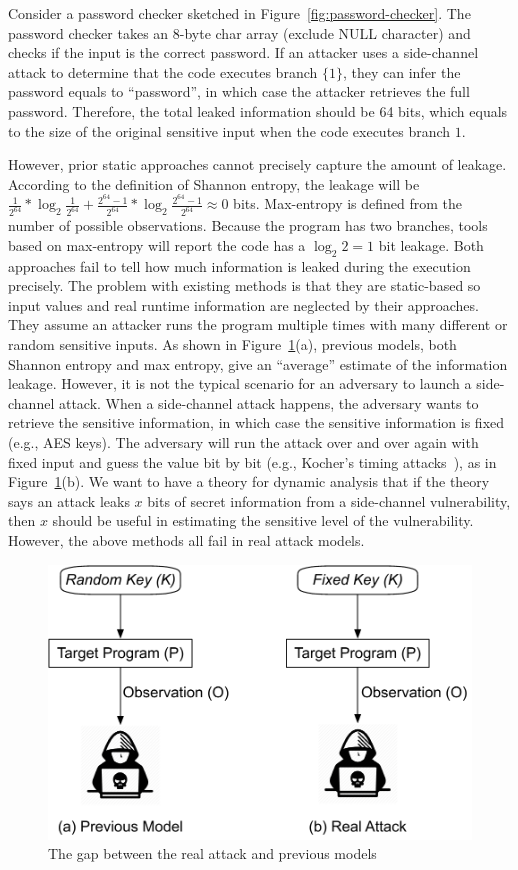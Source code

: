 Consider a password checker sketched in Figure~\ref{fig:password-checker}.
The password checker takes an 8-byte char array (exclude \textsf{NULL} character)
and checks if the input is the correct password. If an attacker uses a side-channel attack to determine that the code executes branch
$\{{1\}}$, they can infer the password equals to
``password'', in which case the attacker retrieves the full password.
Therefore, the total leaked information should be 64 bits, which equals to the
size of the original sensitive input when the code executes branch
$1$.

However, prior static approaches cannot precisely capture the amount of leakage. According to the definition of Shannon entropy, the leakage will be
$\frac{1}{2^{64}}*\log_{2}\frac{1}{2^{64}} + \frac{2^{64}-1}{2^{64}}
    *\log_{2}\frac{2^{64}-1}{2^{64}} \approx 0$ bits. Max-entropy is defined from the
number of possible observations. Because the program has two
branches, tools based on max-entropy will report the code has a $\log_2{2} = 1$
bit leakage.
Both approaches fail to tell how much information is leaked during the execution
precisely. The problem with existing methods is that they are static-based so
input values and real runtime information are neglected by their approaches.
They assume an attacker runs
the program multiple times with many different or random sensitive inputs. As
shown in Figure~\ref{fig:gap}(a), previous models, both Shannon entropy and max
entropy, give an ``average'' estimate of the information leakage. However, it is
not the typical scenario for an adversary to launch a side-channel attack. When
a side-channel attack happens, the adversary wants to retrieve the sensitive
information, in which case the sensitive information is fixed (e.g., AES keys).
The adversary will run the attack over and over again with fixed input and
guess the value bit by
bit (e.g., Kocher's timing attacks~\cite{kocher1996timing}), as in Figure~\ref{fig:gap}(b). We want to have a
theory for dynamic analysis that if the theory says an attack leaks $x$ bits of
secret information from a side-channel vulnerability, then $x$ should be useful
in estimating the sensitive level of the vulnerability. However, the above
methods all fail in real attack models.
\begin{figure}
    \centering
    \includegraphics[width=.65\columnwidth]{./figures/chapter4/RA.pdf}
    \caption{The gap between the real attack and previous models}\label{fig:gap}
\end{figure}

